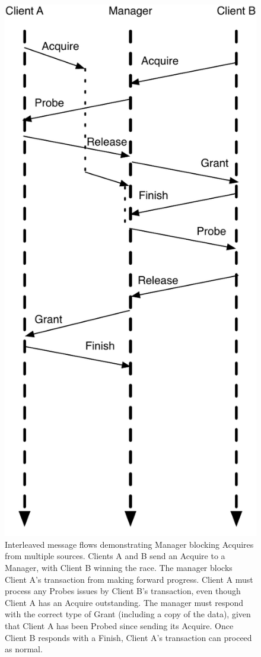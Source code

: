\begin{figure}[p]
\centering
\includegraphics[width=0.5\columnwidth]{tilelink/figures/ordered.pdf}
\caption{Interleaved message flows demonstrating Manager blocking Acquires from multiple sources.
Clients A and B send an Acquire to a Manager, with Client B winning the race.
The manager blocks Client A's transaction from making forward progress.
Client A must process any Probes issues by Client B's transaction, even though Client A has an Acquire outstanding.
The manager must respond with the correct type of Grant (including a copy of the data), given that Client A has been Probed since sending its Acquire.
Once Client B responds with a Finish, Client A's transaction can proceed as normal.
}
\label{fig:ordered}
\end{figure}

